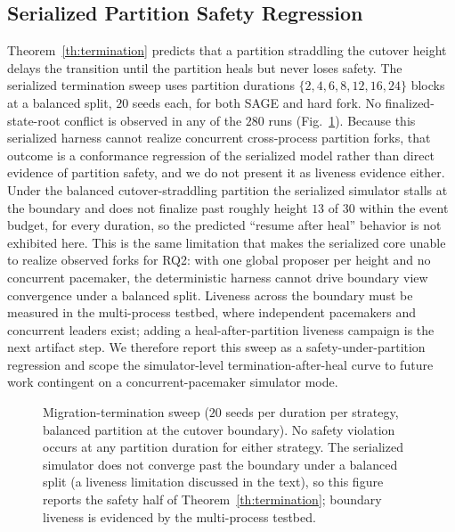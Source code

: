 \documentclass[journal]{IEEEtran}
\theoremstyle{definition}
\theoremstyle{remark}
\begin{document}
\subsection{Serialized Partition Safety Regression}
Theorem~\ref{th:termination} predicts that a partition straddling the cutover height delays
the transition until the partition heals but never loses safety. The serialized termination
sweep uses partition durations $\{2,4,6,8,12,16,24\}$ blocks at a
balanced split, $20$ seeds each, for both SAGE and hard fork. No finalized-state-root conflict is
observed in any of the $280$ runs (Fig.~\ref{fig:termination}). Because this serialized harness
cannot realize concurrent cross-process partition forks, that outcome is a conformance regression
of the serialized model rather than direct evidence of partition safety, and we do not present it
as liveness evidence either.
Under the balanced cutover-straddling partition the serialized simulator stalls at the boundary
and does not finalize past roughly height $13$ of $30$ within the event budget, for every duration,
so the predicted ``resume after heal'' behavior is not exhibited here. This is the same limitation
that makes the serialized core unable to realize observed forks for RQ2: with one global proposer
per height and no concurrent pacemaker, the deterministic harness cannot drive boundary view
convergence under a balanced split. Liveness across the boundary must be measured in the
multi-process testbed, where independent pacemakers and concurrent leaders exist; adding a
heal-after-partition liveness campaign is the next artifact step. We therefore report this sweep
as a safety-under-partition regression and scope the simulator-level termination-after-heal curve
to future work contingent on a concurrent-pacemaker simulator mode.

\begin{figure}[t]
\centering
{}
\caption{Migration-termination sweep ($20$ seeds per duration per strategy, balanced
partition at the cutover boundary). No safety violation occurs at any partition duration for
either strategy. The serialized simulator does not converge past the boundary under a balanced
split (a liveness limitation discussed in the text), so this figure reports the safety half of
Theorem~\ref{th:termination}; boundary liveness is evidenced by the multi-process testbed.}
\label{fig:termination}
\end{figure}
\end{document}
